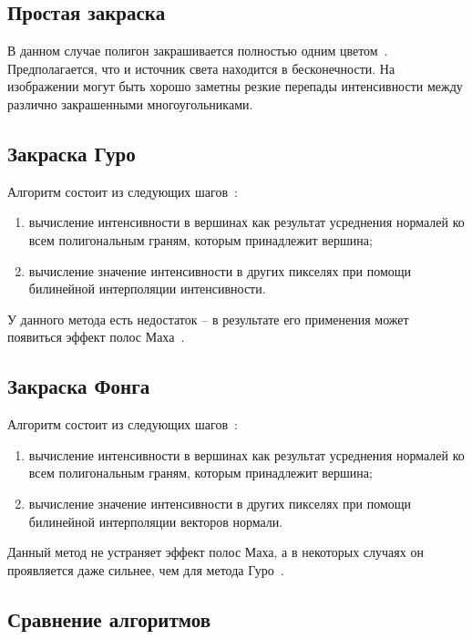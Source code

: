 \subsection{Простая закраска}

В данном случае полигон закрашивается полностью одним цветом~\cite{cannon}. Предполагается, что и источник света находится в бесконечности. На изображении могут быть хорошо заметны резкие перепады интенсивности между различно закрашенными многоугольниками.

\subsection{Закраска Гуро}

Алгоритм состоит из следующих шагов~\cite{gaf}:

\begin{enumerate}[label=\arabic*.]
	\item вычисление интенсивности в вершинах как результат усреднения нормалей ко всем полигональным граням, которым принадлежит вершина;
	\item вычисление значение интенсивности в других пикселях при помощи билинейной интерполяции интенсивности. 
\end{enumerate}

У данного метода есть недостаток -- в результате его применения может появиться эффект полос Маха~\cite{cannon}.

\subsection{Закраска Фонга}

Алгоритм состоит из следующих шагов~\cite{gaf}:

\begin{enumerate}[label=\arabic*.]
	\item вычисление интенсивности в вершинах как результат усреднения нормалей ко всем полигональным граням, которым принадлежит вершина;
	\item вычисление значение интенсивности в других пикселях при помощи билинейной интерполяции векторов нормали. 
\end{enumerate}

Данный метод не устраняет эффект полос Маха, а в некоторых случаях он проявляется даже сильнее, чем для метода Гуро~\cite{cannon}.

\subsection{Сравнение алгоритмов}

